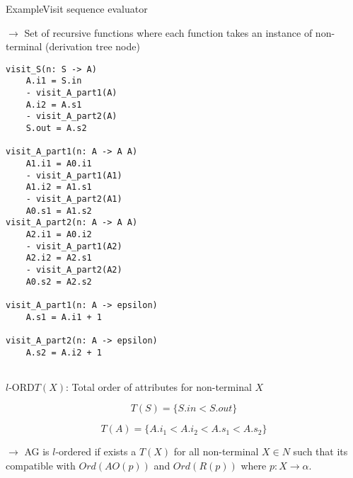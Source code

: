 \begin{frame}[fragile=singleslide]{Example}{Visit sequence evaluator}

$\to$ Set of \alert{recursive functions} where each function takes an \alert{instance of non-terminal} (derivation tree node)

\begin{multicols}{2}
\begin{Verbatim}[fontsize=\scriptsize]
visit_S(n: S -> A)
    A.i1 = S.in
    - visit_A_part1(A)
    A.i2 = A.s1
    - visit_A_part2(A)
    S.out = A.s2

visit_A_part1(n: A -> A A)
    A1.i1 = A0.i1
    - visit_A_part1(A1)
    A1.i2 = A1.s1
    - visit_A_part2(A1)
    A0.s1 = A1.s2
visit_A_part2(n: A -> A A)
    A2.i1 = A0.i2
    - visit_A_part1(A2)
    A2.i2 = A2.s1
    - visit_A_part2(A2)
    A0.s2 = A2.s2

visit_A_part1(n: A -> epsilon)
    A.s1 = A.i1 + 1

visit_A_part2(n: A -> epsilon)
    A.s2 = A.i2 + 1
    
\end{Verbatim}
\end{multicols}
\end{frame}



\begin{frame}{$l$-ORD}{$T(X)$: Total order of attributes for non-terminal $X$ }

\[  T(S) = \{ S.\mathit{in} < S.\mathit{out}  \}  \]

\[  T(A) = \{ A.i_1 < A.i_2 < A.s_1 < A.s_2 \}  \]

\newlinevspace

$\to$ AG is $l$-ordered if exists a $T(X)$  for all non-terminal $X \in N$ such that its \alert{compatible} with $\mathit{Ord}(\mathit{AO}(p))$ and $\mathit{Ord}(R(p))$ where $p: X \rightarrow \alpha$. 

\end{frame}




